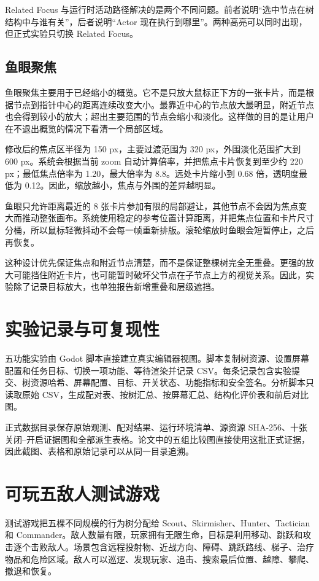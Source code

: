 \documentclass[11pt,a4paper,oneside,extrafontsizes]{memoir}
\begin{document}
Related Focus 与运行时活动路径解决的是两个不同问题。前者说明“选中节点在树结构中与谁有关”，后者说明“Actor 现在执行到哪里”。两种高亮可以同时出现，但正式实验只切换 Related Focus。

\subsection{鱼眼聚焦}

鱼眼聚焦主要用于已经缩小的概览。它不是只放大鼠标正下方的一张卡片，而是根据节点到指针中心的距离连续改变大小。最靠近中心的节点放大最明显，附近节点也会得到较小的放大；超出主要范围的节点会缩小和淡化。这样做的目的是让用户在不退出概览的情况下看清一个局部区域。

修改后的焦点区半径为 150 px，主要过渡范围为 320 px，外围淡化范围扩大到 600 px。系统会根据当前 zoom 自动计算倍率，并把焦点卡片恢复到至少约 220 px；最低焦点倍率为 1.20，最大倍率为 8.8。远处卡片缩小到 0.68 倍，透明度最低为 0.12。因此，缩放越小，焦点与外围的差异越明显。

鱼眼只允许距离最近的 8 张卡片参加有限的局部避让，其他节点不会因为焦点变大而推动整张画布。系统使用稳定的参考位置计算距离，并把焦点位置和卡片尺寸分桶，所以鼠标轻微抖动不会每一帧重新排版。滚轮缩放时鱼眼会短暂停止，之后再恢复。

这种设计优先保证焦点和附近节点清楚，而不是保证整棵树完全无重叠。更强的放大可能挡住附近卡片，也可能暂时破坏父节点在子节点上方的视觉关系。因此，实验除了记录目标放大，也单独报告新增重叠和层级遮挡。

\section{实验记录与可复现性}

五功能实验由 Godot 脚本直接建立真实编辑器视图。脚本复制树资源、设置屏幕配置和任务目标、切换一项功能、等待渲染并记录 CSV。每条记录包含实验提交、树资源哈希、屏幕配置、目标、开关状态、功能指标和安全签名。分析脚本只读取原始 CSV，生成配对表、按树汇总、按屏幕汇总、结构化评价表和前后对比图。

正式数据目录保存原始观测、配对结果、运行环境清单、源资源 SHA-256、十张关闭–开启证据图和全部派生表格。论文中的五组比较图直接使用这批正式证据，因此截图、表格和原始记录可以从同一目录追溯。

\section{可玩五敌人测试游戏}

测试游戏把五棵不同规模的行为树分配给 Scout、Skirmisher、Hunter、Tactician 和 Commander。敌人数量有限，玩家拥有无限生命，目标是利用移动、跳跃和攻击逐个击败敌人。场景包含远程投射物、近战方向、障碍、跳跃路线、梯子、治疗物品和危险区域。敌人可以巡逻、发现玩家、追击、搜索最后位置、越障、攀爬、撤退和恢复。
\end{document}
